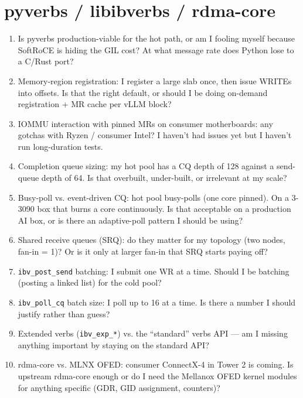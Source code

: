 \documentclass[11pt]{article}
\begin{document}
\section{pyverbs / libibverbs / rdma-core}

\begin{enumerate}
\item Is pyverbs production-viable for the hot path, or am I fooling
myself because SoftRoCE is hiding the GIL cost? At what message rate
does Python lose to a C/Rust port?

\item Memory-region registration: I register a large slab once, then
issue WRITEs into offsets. Is that the right default, or should I be
doing on-demand registration + MR cache per vLLM block?

\item IOMMU interaction with pinned MRs on consumer motherboards: any
gotchas with Ryzen / consumer Intel? I haven't had issues yet but I
haven't run long-duration tests.

\item Completion queue sizing: my hot pool has a CQ depth of 128
against a send-queue depth of 64. Is that overbuilt, under-built, or
irrelevant at my scale?

\item Busy-poll vs. event-driven CQ: hot pool busy-polls (one core
pinned). On a 3-3090 box that burns a core continuously. Is that
acceptable on a production AI box, or is there an adaptive-poll
pattern I should be using?

\item Shared receive queues (SRQ): do they matter for my topology
(two nodes, fan-in = 1)? Or is it only at larger fan-in that SRQ
starts paying off?

\item \texttt{ibv\_post\_send} batching: I submit one WR at a time.
Should I be batching (posting a linked list) for the cold pool?

\item \texttt{ibv\_poll\_cq} batch size: I poll up to 16 at a time.
Is there a number I should justify rather than guess?

\item Extended verbs (\texttt{ibv\_exp\_*}) vs. the ``standard'' verbs
API --- am I missing anything important by staying on the standard
API?

\item rdma-core vs. MLNX OFED: consumer ConnectX-4 in Tower 2 is
coming. Is upstream rdma-core enough or do I need the Mellanox OFED
kernel modules for anything specific (GDR, GID assignment, counters)?
\end{enumerate}
\end{document}
